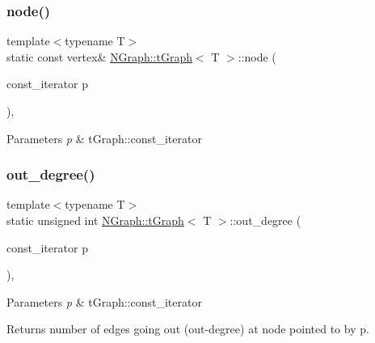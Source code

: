 \subsubsection{\texorpdfstring{node()}{node()}}
{\footnotesize\ttfamily template$<$typename T$>$ \\
static const vertex\& \mbox{\hyperlink{class_n_graph_1_1t_graph}{N\+Graph\+::t\+Graph}}$<$ T $>$\+::node (\begin{DoxyParamCaption}\item[{const\+\_\+iterator}]{p }\end{DoxyParamCaption})\hspace{0.3cm}{\ttfamily [inline]}, {\ttfamily [static]}}


\begin{DoxyParams}{Parameters}
{\em p} & t\+Graph\+::const\+\_\+iterator \\
\hline
\end{DoxyParams}
\mbox{\label{class_n_graph_1_1t_graph_acd67259b93d9ec2de6ca03bf19e027bd}} 
\subsubsection{\texorpdfstring{out\+\_\+degree()}{out\_degree()}}
{\footnotesize\ttfamily template$<$typename T$>$ \\
static unsigned int \mbox{\hyperlink{class_n_graph_1_1t_graph}{N\+Graph\+::t\+Graph}}$<$ T $>$\+::out\+\_\+degree (\begin{DoxyParamCaption}\item[{const\+\_\+iterator}]{p }\end{DoxyParamCaption})\hspace{0.3cm}{\ttfamily [inline]}, {\ttfamily [static]}}


\begin{DoxyParams}{Parameters}
{\em p} & t\+Graph\+::const\+\_\+iterator \\
\hline
\end{DoxyParams}
\begin{DoxyReturn}{Returns}
number of edges going out (out-\/degree) at node pointed to by p. 
\end{DoxyReturn}
\mbox{\label{class_n_graph_1_1t_graph_aa3752935ebcd6e4688b52cd0f6d1211f}} 
